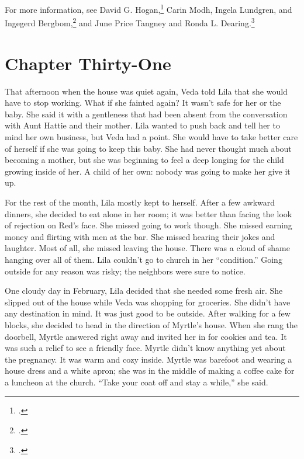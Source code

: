 \documentclass[
  american,
  letterpaper,
]{book}
\begin{document}
For more information, see David G. Hogan,\footnote{.} Carin Modh, Ingela Lundgren, and
Ingegerd Bergbom,\footnote{.} and June Price Tangney
and Ronda L. Dearing.\footnote{.}


\chapter{Chapter Thirty-One}\label{chapter-thirty-one}

That afternoon when the house was quiet again, Veda told Lila that she
would have to stop working. What if she fainted again? It wasn't safe
for her or the baby. She said it with a gentleness that had been absent
from the conversation with Aunt Hattie and their mother. Lila wanted to
push back and tell her to mind her own business, but Veda had a point.
She would have to take better care of herself if she was going to keep
this baby. She had never thought much about becoming a mother, but she
was beginning to feel a deep longing for the child growing inside of
her. A child of her own: nobody was going to make her give it up.

For the rest of the month, Lila mostly kept to herself. After a few
awkward dinners, she decided to eat alone in her room; it was better
than facing the look of rejection on Red's face. She missed going to
work though. She missed earning money and flirting with men at the bar.
She missed hearing their jokes and laughter. Most of all, she missed
leaving the house. There was a cloud of shame hanging over all of them.
Lila couldn't go to church in her ``condition.'' Going outside for any
reason was risky; the neighbors were sure to notice.

One cloudy day in February, Lila decided that she needed some fresh air.
She slipped out of the house while Veda was shopping for groceries. She
didn't have any destination in mind. It was just good to be outside.
After walking for a few blocks, she decided to head in the direction of
Myrtle's house. When she rang the doorbell, Myrtle answered right away
and invited her in for cookies and tea. It was such a relief to see a
friendly face. Myrtle didn't know anything yet about the pregnancy. It
was warm and cozy inside. Myrtle was barefoot and wearing a house dress
and a white apron; she was in the middle of making a coffee cake for a
luncheon at the church. ``Take your coat off and stay a while,'' she
said.
\end{document}
